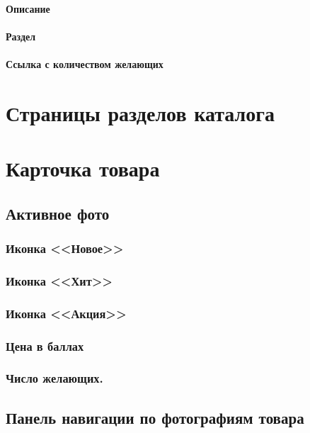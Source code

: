                 \paragraph{Описание}
                \paragraph{Раздел}
                \paragraph{Ссылка с количеством желающих}
            

    \section{Страницы разделов каталога}
        \label{sec:page_catalog_section}


    \section{Карточка товара}
        \label{sec:goods_cart}
        \subsection{Активное фото}
            \subsubsection{Иконка <<Новое>>}
            \subsubsection{Иконка <<Хит>>}
            \subsubsection{Иконка <<Акция>>}
            \subsubsection{Цена в баллах}
            \subsubsection{Число желающих.}

        \subsection{Панель навигации по фотографиям товара}
